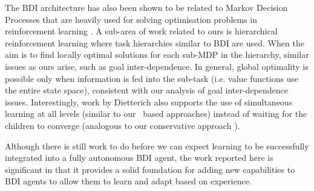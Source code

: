 The BDI architecture has also been shown \cite{simari2006on-th} to be related to Markov Decision Processes that are heavily used for solving optimisation problems in reinforcement learning \cite{Mitchell97:ML}. A sub-area of work related to ours is hierarchical reinforcement learning \cite{barto2003recen} where task hierarchies similar to BDI are used. When the aim is to find locally optimal solutions for each sub-MDP in the hierarchy, similar issues as ours arise, such as goal inter-dependence. In general, global optimality is possible only when information is fed into the sub-task (i.e. value functions use the entire state space), consistent with our analysis of goal inter-dependence issues. Interestingly, work by Dietterich \cite{dietterich2000hiera} also supports the use of simultaneous learning at all levels (similar to our \CL\ based approaches) instead of waiting for the children to converge (analogous to our conservative  approach \cite{Singh:AAMAS10}).

Although there is still work to do before we can expect learning to be
successfully integrated into a fully autonomous BDI agent, the
work reported here is significant in that it provides a solid
foundation for adding new capabilities to BDI agents to allow them to
learn and adapt based on experience.

